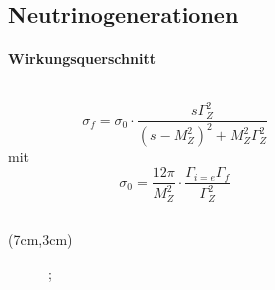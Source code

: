 \subsection{Neutrinogenerationen}

\begin{iframe}
	\framesubtitle{Wirkungsquerschnitt}
	\begin{columns}
		\begin{column}{0.48\textwidth}
			\begin{equation*}
				\sigma_f = \sigma_0 \cdot \frac{s\Gamma_Z^2}{(s-M_Z^2)^2 + M_Z^2\Gamma_Z^2}
			\end{equation*}
			mit
			\begin{equation*}
				\sigma_0 = \frac{12\pi}{M_Z^2}\cdot\frac{\Gamma_{i=e}\Gamma_f}{\Gamma_Z^2}
			\end{equation*}
		\end{column}
		\begin{column}{0.48\textwidth}
		\end{column}
	\end {columns}
	\begin{textblock*}{5cm}(7cm,3cm) %
				\begin{figure}
				;
			\end{figure}
		\end{textblock*}
\end{iframe}

